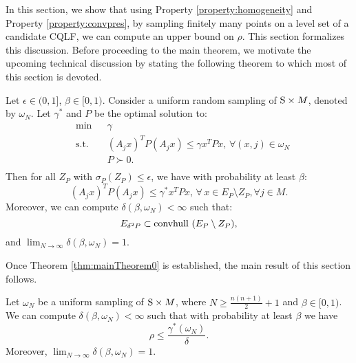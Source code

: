 In this section, we show that using Property \ref{property:homogeneity} and Property \ref{property:convpres}, by sampling finitely many points on a level set of a candidate CQLF, we can compute an upper bound on $\rho$. This section formalizes this discussion. Before proceeding to the main theorem, we motivate the upcoming technical discussion by stating the following theorem to which most of this section is devoted.

\begin{theorem} \label{thm:mainTheorem0} Let $\epsilon \in (0,1]$, $\beta \in [0,1)$. Consider a uniform random sampling of $\text{S} \times M$, denoted by $\omega_N$. Let $\gamma^*$ and $P$ be the optimal solution to:
\begin{equation}\label{eqn:campiOpt01}
\begin{aligned}
& \text{min} & & \gamma \\
& \text{s.t.} 
&  & (A_j x)^TP(A_j x) \leq \gamma x^TPx,\,\forall (x, j) \in \omega_N \\
& && P \succ 0. \\
\end{aligned}
\end{equation}
Then for all $Z_P$ with $\sigma_P(Z_P)\leq \epsilon$, we have with probability at least $\beta$:
\begin{equation} \label{eqn:exceptEps}(A_j x)^TP(A_j x)\leq \gamma^*x^TPx,\,\forall\, x \in E_P \setminus Z_P, \forall j \in M.\end{equation}
Moreover, we can compute $\delta(\beta, \omega_N) < \infty$  such that:
\begin{equation}\label{eqn:contraction}E_{\delta^2P} \subset  \mbox{convhull } (E_{P} \setminus Z_{P}),
\end{equation}
and $\lim_{N \to \infty} \delta(\beta, \omega_N) = 1.$
\end{theorem}

Once Theorem \ref{thm:mainTheorem0} is established, the main result of this section follows.

\begin{theorem} \label{thm:mainTheorem} Let $\omega_N$ be a uniform sampling of $\text{S} \times M$, where $N \geq \frac{n(n+1)}{2}+1$ and $\beta \in [0,1)$. We can compute $\delta(\beta, \omega_N) < \infty$ such that with probability at least $\beta$ we have $$\rho \leq \frac{\gamma^*(\omega_N)}{\delta}.$$ Moreover, $\lim_{N \to \infty} \delta(\beta, \omega_N) = 1$.
\end{theorem}

